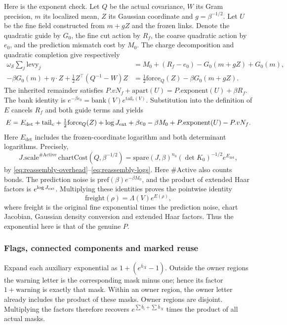 Here is the exponent check. Let $Q$ be the actual covariance,
$W$ its Gram precision, $m$ its localized mean, $Z$ its Gaussian
coordinate and $g=\beta^{-1/2}$. Let $U$ be the fine field
constructed from $m+gZ$ and the frozen links. Denote the
quadratic guide by $G_0$, the fine cut action by $R_f$, the
coarse quadratic action by $e_0$, and the prediction mismatch
cost by $M_0$. The charge decomposition and quadratic completion
give respectively
\begin{align*}
 \omega_{\mathcal S}\sum_j\mathrm{levy}_j
   &=M_0+(R_f-e_0)-G_0(m+gZ)+G_0(m),\\
 -\beta G_0(m)+\eta\cdot Z
       +\tfrac12 Z^\top(Q^{-1}-W)Z
   &=\tfrac12\mathrm{force}_Q(Z)-\beta G_0(m+gZ).
\end{align*}
The inherited remainder satisfies
$P.vN_f+\mathrm{apart}(U)=P.\mathrm{exponent}(U)+\beta R_f$.
The bank identity is
$e^{-\beta e_0}=\mathrm{bank}(V)e^{\mathrm{tail}_c(V)}$.
Substitution into the definition of $E$ cancels $R_f$ and both
guide terms and yields
\[
 E=E_{\det}+\mathrm{tail}_c+\tfrac12\mathrm{force}_Q(Z)
       +\log J_{\rm ext}+\beta e_0-\beta M_0
       +P.\mathrm{exponent}(U)-P.vN_f.
\]
Here $E_{\det}$ includes the frozen-coordinate logarithm and
both determinant logarithms. Precisely,
\[
 J.\mathrm{scale}^{\#\mathrm{Active}}\,
       \mathrm{chartCost}(Q,\beta^{-1/2})
 =\mathrm{spare}(J,\beta)^{n_0}(\det K_0)^{-1/2}e^{E_{\det}},
\]
by \eqref{eq:reassembly-overhead}--\eqref{eq:reassembly-logs}.
Here $\#\mathrm{Active}$ also counts bonds. The prediction noise is
$\mathrm{pref}(\beta)e^{-\beta M_0}$, and the product of
extended Haar factors is $e^{\log J_{\rm ext}}$. Multiplying
these identities proves the pointwise identity
\begin{equation}\label{eq:actual-body-density}
 \mathrm{freight}(\rho)=\Lambda(V)e^{E(\rho)},
\end{equation}
where freight is the original fine exponential times the
prediction noise, chart Jacobian, Gaussian density conversion
and extended Haar factors. Thus the exponential here is that
of the genuine $P$.

\subsubsection{Flags, connected components and marked reuse}

Expand each auxiliary exponential as $1+(e^{\bar h_X}-1)$.
Outside the owner regions the warning letter is the corresponding
mask minus one; hence its factor $1+\mathrm{warning}$ is
exactly that mask. Within an owner region, the owner letter
already includes the product of these masks. Owner regions are
disjoint. Multiplying the factors therefore recovers
$e^{\sum\bar b_i+\sum\bar h_X}$ times the product of all
actual masks.

